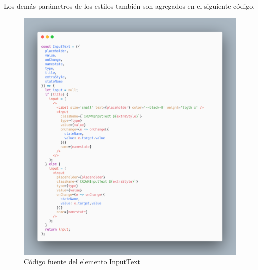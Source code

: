 Los demás parámetros de los estilos también son agregados en el siguiente código.
\newline
\newline
\begin{figure}[H]
    \includegraphics[width=1\textwidth]{./Imagenes/carbon-12.png}
    \caption[Código fuente del elemento InputText]{Código fuente del elemento InputText}
    \end{figure}
\newline
\newline
\clearpage



